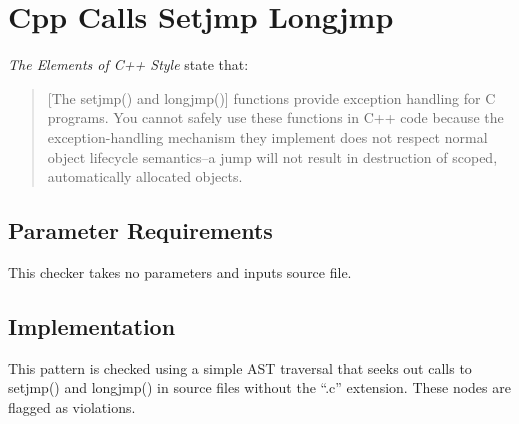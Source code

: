 %
%

\section{Cpp Calls Setjmp Longjmp}
\label{CppCallsSetjmpLongjmp::overview}

{\it The Elements of C++ Style} state that:
\begin{quote}
[The setjmp() and longjmp()] functions provide exception handling for C programs. You cannot safely use these functions in C++ code because the exception-handling mechanism they implement does not respect normal object lifecycle semantics--a jump will not result in destruction of scoped, automatically allocated objects.
\end{quote}

\subsection{Parameter Requirements}
This checker takes no parameters and inputs source file.

\subsection{Implementation}
This pattern is checked using a simple AST traversal that seeks out calls
to setjmp() and longjmp() in source files without the ``.c'' extension. These
nodes are flagged as violations.


